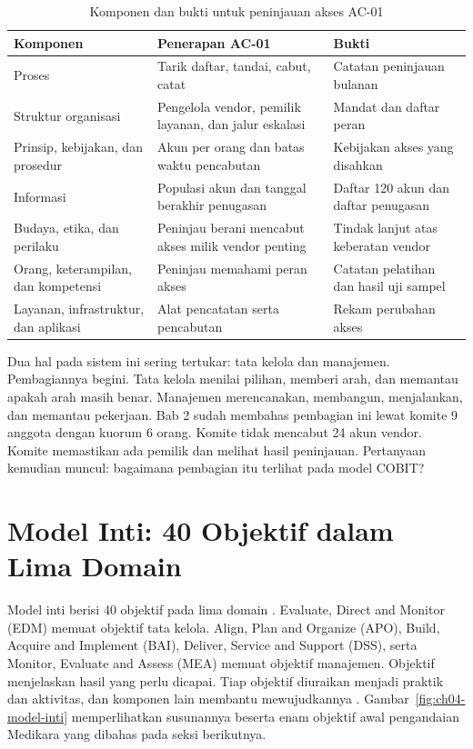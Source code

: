 \begin{table}[!htb]
  \centering\small
  \caption{Komponen dan bukti untuk peninjauan akses AC-01}\label{tab:ch04-komponen}
  \begin{tabularx}{\textwidth}{|>{\raggedright\arraybackslash}p{}|>{\raggedright\arraybackslash}X|>{\raggedright\arraybackslash}X|}
    \hline
    \textbf{Komponen} & \textbf{Penerapan AC-01} & \textbf{Bukti} \\ \hline
    Proses & Tarik daftar, tandai, cabut, catat & Catatan peninjauan bulanan \\ \hline
    Struktur organisasi & Pengelola vendor, pemilik layanan, dan jalur eskalasi & Mandat dan
    daftar peran \\ \hline
    Prinsip, kebijakan, dan prosedur & Akun per orang dan batas waktu pencabutan & Kebijakan akses
    yang disahkan \\ \hline
    Informasi & Populasi akun dan tanggal berakhir penugasan & Daftar 120 akun dan daftar
    penugasan \\ \hline
    Budaya, etika, dan perilaku & Peninjau berani mencabut akses milik vendor penting & Tindak lanjut
    atas keberatan vendor \\ \hline
    Orang, keterampilan, dan kompetensi & Peninjau memahami peran akses & Catatan pelatihan dan
    hasil uji sampel \\ \hline
    Layanan, infrastruktur, dan aplikasi & Alat pencatatan serta pencabutan & Rekam perubahan
    akses \\ \hline
  \end{tabularx}
\end{table}

Dua hal pada sistem ini sering tertukar: tata kelola dan manajemen. Pembagiannya begini. Tata kelola
menilai pilihan, memberi arah, dan memantau apakah arah masih benar. Manajemen merencanakan, membangun,
menjalankan, dan memantau pekerjaan. Bab 2 sudah membahas pembagian ini lewat komite 9 anggota dengan
kuorum 6 orang. Komite tidak mencabut 24 akun vendor. Komite memastikan ada pemilik dan melihat hasil
peninjauan. Pertanyaan kemudian muncul: bagaimana pembagian itu terlihat pada model COBIT?

\section{Model Inti: 40 Objektif dalam Lima Domain}

Model inti berisi 40 objektif pada lima domain \cite{c04-baru}. Evaluate, Direct and Monitor (EDM) memuat
objektif tata kelola. Align, Plan and Organize (APO), Build, Acquire and Implement (BAI), Deliver,
Service and Support (DSS), serta Monitor, Evaluate and Assess (MEA) memuat objektif manajemen. Objektif
menjelaskan hasil yang perlu dicapai. Tiap objektif diuraikan menjadi praktik dan aktivitas, dan komponen
lain membantu mewujudkannya \cite{c04-kontinuitas,c04-sistematis}. Gambar~\ref{fig:ch04-model-inti}
memperlihatkan susunannya beserta enam objektif awal pengandaian Medikara yang dibahas pada seksi
berikutnya.

